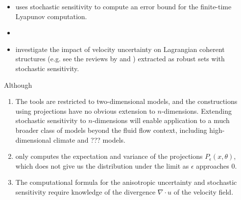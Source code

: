 \begin{itemize}
	\item \citet{Balasuriya_2020_UncertaintyFinitetimeLyapunov} uses stochastic sensitivity to compute an error bound for the finite-time Lyapunov computation.


	\item \citet{FangEtAl_2020_DisentanglingResolutionPrecision}


	\item \citet{BadzaEtAl_2023_HowSensitiveAre} investigate the impact of velocity uncertainty on Lagrangian coherent structures (e.g. see the reviews by \citet{BalasuriyaEtAl_2018_GeneralizedLagrangianCoherent} and \citet{HadjighasemEtAl_2017_CriticalComparisonLagrangian}) extracted as robust sets with stochastic sensitivity.

\end{itemize}

Although

\begin{enumerate}
	\item The tools are restricted to two-dimensional models, and the constructions using projections have no obvious extension to \(n\)-dimensions.
	      Extending stochastic sensitivity to \(n\)-dimensions will enable application to a much broader class of models beyond the fluid flow context, including high-dimensional climate and ??? models.

	\item \citet{Balasuriya_2020_StochasticSensitivityComputable} only computes the expectation and variance of the projections \(P_\epsilon(x,\theta)\), which does not give us the distribution under the limit as \(\epsilon\) approaches 0.

	\item The computational formula for the anisotropic uncertainty and stochastic sensitivity require knowledge of the divergence \(\nabla\cdot u\) of the velocity field.
\end{enumerate}



